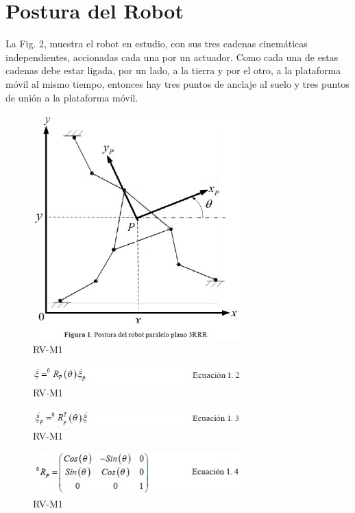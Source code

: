 \documentclass[letter,openright,12pt,spanish]{report}
\begin{document}
\section{Postura del Robot}

La Fig. 2, muestra el robot en estudio, con sus tres cadenas cinemáticas independientes, accionadas cada una por un actuador. Como cada una de estas cadenas debe estar ligada, por un lado, a la tierra y por el otro, a la plataforma móvil al mismo tiempo, entonces hay tres puntos de anclaje al suelo y tres puntos de unión a la plataforma móvil.\\

\begin{figure}[htp]
\centering
\includegraphics[width=8cm]{2.jpg}
\caption{RV-M1}
\label{Figura 2}
\end{figure}

\begin{figure}[htp]
\centering
\includegraphics[width=8cm]{3.jpg}
\caption{RV-M1}
\label{Figura 3}
\end{figure}

\begin{figure}[htp]
\centering
\includegraphics[width=8cm]{4.jpg}
\caption{RV-M1}
\label{Figura 4}
\end{figure}

\begin{figure}[htp]
\centering
\includegraphics[width=8cm]{5.jpg}
\caption{RV-M1}
\label{Figura 5}
\end{figure}
\end{document}
